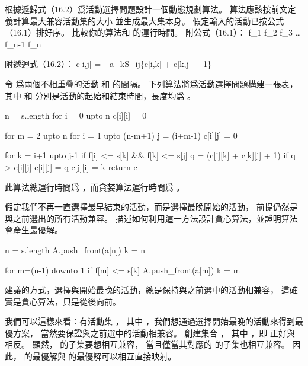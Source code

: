 \startsection[
  title={An activity-selection problem},
]

\startEXERCISE
根據遞歸式（16.2）爲活動選擇問題設計一個動態規劃算法。
算法應該按前文定義計算最大兼容活動集的大小  並生成最大集本身。
假定輸入的活動已按公式（16.1）排好序。
比較你的算法和  的運行時間。
附公式（16.1）：
\startformula
f_1 \le f_2 \le f_3 \le \ldots \le f_{n-1} \le f_n
\stopformula

附遞迴式（16.2）：
\startformula
c[i,j] = \startcases
{} \MC {} \NR
\NC \max_{a_k\in S_{ij}}\{c[i,k] + c[k,j] + 1\} \MC {} \NR
\stopcases\stopformula
\stopEXERCISE

\startANSWER
令  爲兩個不相重疊的活動  和  的間隔。
下列算法將爲活動選擇問題構建一張表，
其中  和  分別是活動的起始和結束時間，長度均爲 。

\startCLRS
n = s.length
for i = 0 upto n
	c[i][i] = 0

for m = 2 upto n
	for i = 1 upto (n-m+1)
		j = (i+m-1)
		c[i][j] = 0

		for k = i+1 upto j-1
			if f[i] <= s[k] && f[k] <= s[j]
				q = (c[i][k] + c[k][j] + 1)
				if q > c[i][j]
					c[i][j] = q
					c[j][i] = k
return c
\stopCLRS

此算法總運行時間爲 ，而貪婪算法運行時間爲 。
\stopANSWER

\startEXERCISE
假定我們不再一直選擇最早結束的活動，而是選擇最晚開始的活動，
前提仍然是與之前選出的所有活動兼容。
描述如何利用這一方法設計貪心算法，並證明算法會產生最優解。
\stopEXERCISE

\startANSWER
{}
\startCLRS
n = s.length
A.push_front(a[n])
k = n

for m=(n-1) downto 1
	if f[m] <= s[k]
		A.push_front(a[m])
		k = m
\stopCLRS

建議的方式，選擇與開始最晚的活動，總是保持與之前選中的活動相兼容，
這確實是貪心算法，只是從後向前。

我們可以這樣來看：有活動集 ，
其中 \m{a_i=[s_i,f_i)}，我們想通過選擇開始最晚的活動來得到最優方案，
當然要保證與之前選中的活動相兼容。
創建集合 ，
其中 \m{a'_i=[f_i,s_i)}，即  正好與  相反。
顯然， 的子集要想相互兼容，
當且僅當其對應的  的子集也相互兼容。
因此，  的最優解與  的最優解可以相互直接映射。
\stopANSWER

